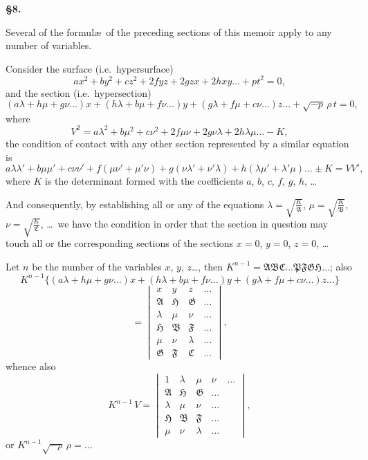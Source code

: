 \documentclass[11pt]{article}
\begin{document}
\newpage
\setcounter{page}{84}

\noindent\textbf{\S 8.}

Several of the formul\ae\ of the preceding sections of this memoir apply to any number of variables.

Consider the surface (i.e.\ hypersurface)
\[
ax^2+by^2+cz^2+2fyz+2gzx+2hxy\ldots+pt^2=0,
\]
and the section (i.e.\ hypersection)
\[
(a\lambda+h\mu+g\nu\ldots)x + (h\lambda+b\mu+f\nu\ldots)y + (g\lambda+f\mu+c\nu\ldots)z\ldots + \sqrt{-p}\,\rho\,t = 0,
\]
where
\[
V^2 = a\lambda^2+b\mu^2+c\nu^2+2f\mu\nu+2g\nu\lambda+2h\lambda\mu\ldots-K,
\]
the condition of contact with any other section represented by a similar equation is
\[
a\lambda\lambda'+b\mu\mu'+c\nu\nu'+f(\mu\nu'+\mu'\nu)+g(\nu\lambda'+\nu'\lambda)+h(\lambda\mu'+\lambda'\mu)\ldots \pm K = VV',
\]
where $K$ is the determinant formed with the coefficients $a$, $b$, $c$, $f$, $g$, $h$, \ldots

And consequently, by establishing all or any of the equations $\lambda=\sqrt{\tfrac{K}{\mathfrak{A}}}$, $\mu=\sqrt{\tfrac{K}{\mathfrak{B}}}$, $\nu=\sqrt{\tfrac{K}{\mathfrak{C}}}$, \ldots\ we have the condition in order that the section in question may touch all or the corresponding sections of the sections $x=0$, $y=0$, $z=0$, \ldots

Let $n$ be the number of the variables $x$, $y$, $z$\ldots, then $K^{n-1}=\mathfrak{A}\mathfrak{B}\mathfrak{C}\ldots\mathfrak{P}\mathfrak{F}\mathfrak{G}\mathfrak{H}\ldots$; also
\[
K^{n-1}\{(a\lambda+h\mu+g\nu\ldots)x+(h\lambda+b\mu+f\nu\ldots)y+(g\lambda+f\mu+c\nu\ldots)z\ldots\}
\]
\[
= \begin{vmatrix}
x & y & z & \ldots \\
\mathfrak{A} & \mathfrak{H} & \mathfrak{G} & \ldots \\
\lambda & \mu & \nu & \ldots \\
\mathfrak{H} & \mathfrak{B} & \mathfrak{F} & \ldots \\
\mu & \nu & \lambda & \ldots \\
\mathfrak{G} & \mathfrak{F} & \mathfrak{C} & \ldots
\end{vmatrix},
\]
whence also
\[
K^{n-1}\,V = \begin{vmatrix}
1 & \lambda & \mu & \nu & \ldots \\
\mathfrak{A} & \mathfrak{H} & \mathfrak{G} & \ldots \\
\lambda & \mu & \nu & \ldots \\
\mathfrak{H} & \mathfrak{B} & \mathfrak{F} & \ldots \\
\mu & \nu & \lambda & \ldots
\end{vmatrix},
\]
or $K^{n-1}\sqrt{-p}\,\rho = \ldots$
\end{document}
